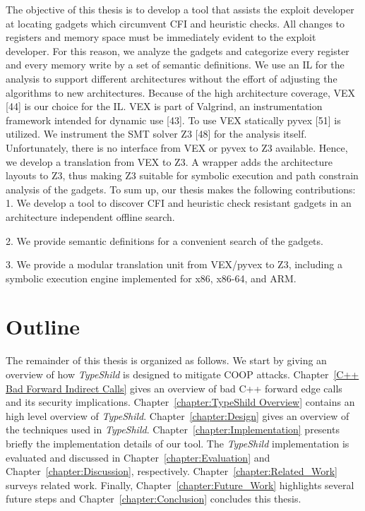 The objective of this thesis is to develop a tool that assists the exploit developer at
locating gadgets which circumvent CFI and heuristic checks. All changes to registers
and memory space must be immediately evident to the exploit developer. For this
reason, we analyze the gadgets and categorize every register and every memory write
by a set of semantic definitions. We use an IL for the analysis to support different
architectures without the effort of adjusting the algorithms to new architectures.
Because of the high architecture coverage, VEX [44] is our choice for the IL. VEX is
part of Valgrind, an instrumentation framework intended for dynamic use [43]. To
use VEX statically pyvex [51] is utilized. We instrument the SMT solver Z3 [48]
for the analysis itself. Unfortunately, there is no interface from VEX or pyvex to
Z3 available. Hence, we develop a translation from VEX to Z3. A wrapper adds
the architecture layouts to Z3, thus making Z3 suitable for symbolic execution and
path constrain analysis of the gadgets. To sum up, our thesis makes the following
contributions:
1. We develop a tool to discover CFI and heuristic check resistant gadgets in an
architecture independent offline search.

2. We provide semantic definitions for a convenient search of the gadgets.

3. We provide a modular translation unit from VEX/pyvex to Z3, including a
symbolic execution engine implemented for x86, x86-64, and ARM.

\section{Outline}
\label{Outline}
The remainder of this thesis is organized as follows.
We start by giving an overview of how \textit{TypeShild}
is designed to mitigate COOP attacks. 
Chapter~\ref{C++ Bad Forward Indirect Calls} gives an overview of bad C++
forward edge calls and its security implications.
Chapter~\ref{chapter:TypeShild Overview} contains an high level overview of \textit{TypeShild}.
Chapter~\ref{chapter:Design} gives an overview of the techniques
used in \textit{TypeShild}.
Chapter~\ref{chapter:Implementation} presents briefly the implementation
details of our tool.
The \textit{TypeShild} implementation is evaluated and discussed in
Chapter~\ref{chapter:Evaluation} and Chapter~\ref{chapter:Discussion}, respectively.
Chapter~\ref{chapter:Related_Work} surveys related work.
Finally, Chapter~\ref{chapter:Future_Work} highlights several future steps and
Chapter~\ref{chapter:Conclusion} concludes this thesis.


